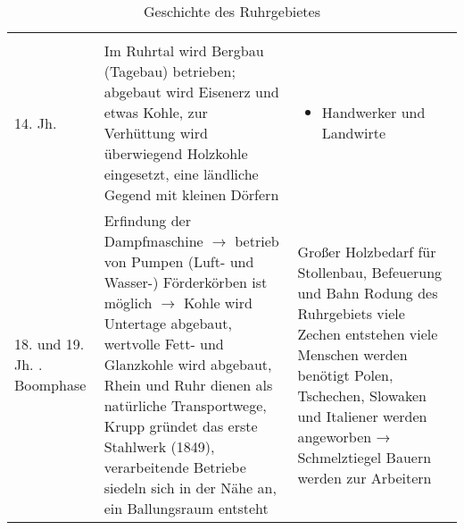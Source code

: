 \renewcommand{\longtableheader}{}
\begin{longtable}{p{0.1\hsize}p{0.5\hsize}p{0.3\hsize}}
	\longtableheader
	\endfirsthead

	\longtableheader
	\endhead

	\caption{Geschichte des Ruhrgebietes}
	\endlastfoot

	\multicolumn{3}{r}{\longtableendfoot}\\
	\endfoot

	14. Jh.	& Im Ruhrtal wird Bergbau (Tagebau) betrieben; abgebaut wird Eisenerz und etwas Kohle,
	zur Verhüttung wird überwiegend Holzkohle eingesetzt, eine ländliche Gegend mit kleinen Dörfern
	& \begin{itemize}\item Handwerker und Landwirte\end{itemize} \\
	18. und 19. Jh. \newline 1. Boomphase & Erfindung der Dampfmaschine $\rightarrow$ betrieb von Pumpen
	(Luft- und Wasser-) Förderkörben ist möglich $\rightarrow$ Kohle wird Untertage abgebaut,
	wertvolle Fett- und Glanzkohle wird abgebaut, Rhein und Ruhr dienen als natürliche Transportwege,
	Krupp gründet das erste Stahlwerk (1849), verarbeitende Betriebe siedeln sich in der Nähe an, ein Ballungsraum entsteht
	& Großer Holzbedarf für Stollenbau, Befeuerung und Bahn
Rodung des Ruhrgebiets
viele Zechen entstehen
viele Menschen werden benötigt
Polen, Tschechen, Slowaken und Italiener werden angeworben
→ Schmelztiegel
Bauern werden zur Arbeitern \\
\end{longtable}